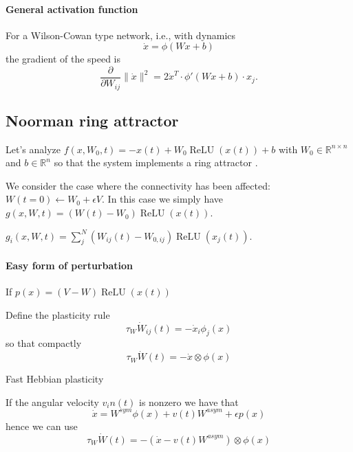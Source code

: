 \documentclass{article}
\theoremstyle{definition} \newtheorem{definition}{Definition}
\theoremstyle{remark} \newtheorem{remark}{Remark}
\newcommand{\reals}{\mathbb{R}}
\newcommand{\relu}{\operatorname{ReLU}}
\newcounter{ct}
\begin{document}


\paragraph{General activation function}
For a Wilson-Cowan type network, i.e., with dynamics 
\begin{equation}
\dot x = \phi(Wx+b) 
\end{equation}
 the gradient of the speed is
\begin{equation}
\frac{\partial}{\partial W_{ij}} \|\dot{x}\|^2 = 2 \dot{x}^T \cdot \phi'(Wx+b) \cdot x_j.
\end{equation}



\subsection{Noorman ring attractor}
Let's analyze $f(x,W_0,t) = -x(t) + W_0\relu(x(t)) + b$ with $W_0\in\reals^{n\times n}$ and $b\in\reals^n$ so that the system implements a ring attractor \citep{noorman2024accurate}.

We consider the case where the connectivity has been affected: $W(t=0) \leftarrow W_0 + \epsilon V$.
In this case we simply have $g(x,W,t) = (W(t)-W_0)\relu(x(t))$.

$g_i(x,W,t) = \sum_{j}^N(W_{ij}(t)-W_{0,ij})\relu(x_j(t))$.


\paragraph{Easy form of perturbation}
If $p(x) = (V-W)\relu(x(t))$


Define the plasticity rule
\begin{equation}\label{eq:plasticity_heur}
\tau_W\dot W_{ij}(t) = - \dot x_i \phi_j(x) 
\end{equation}
so that compactly
\begin{equation}\label{eq:plasticity_heur_comp}
\tau_W\dot W(t) = - \dot x \otimes \phi(x) 
\end{equation}

Fast Hebbian plasticity \citep{lansner2023fast}

If the angular velocity $v_in(t)$ is nonzero we have that 
\begin{equation}
\dot x = W^{sym}\phi(x) + v(t)W^{asym} + \epsilon p(x)
\end{equation}
hence we can use
\begin{equation}\label{eq:plasticity_heur_comp_vin}
\tau_W\dot W(t) = - (\dot x - v(t)W^{asym}) \otimes \phi(x) 
\end{equation}
\end{document}
